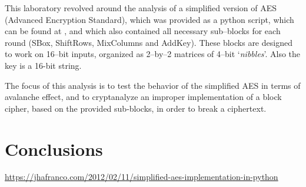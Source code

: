 \documentclass[12pt]{article}
\begin{document}
This laboratory revolved around the analysis of a simplified version of AES (Advanced Encryption Standard), which was provided as a python script, which can be found at \cite{Original Python implementation}, and which also contained all necessary sub–blocks for each round (SBox, ShiftRows, MixColumns and AddKey).
These blocks are designed to work on 16–bit inputs, organized as 2–by–2 matrices of 4–bit `\textit{nibbles}'. Also the key is a 16-bit string.

The focus of this analysis is to test the behavior of the simplified AES in terms of avalanche effect, and to cryptanalyze an improper implementation of a block cipher, based on the provided sub-blocks, in order to break a ciphertext.


\section{Conclusions}
\label{sec:04}

\begin{thebibliography}{5}
    \url{https://jhafranco.com/2012/02/11/simplified-aes-implementation-in-python}
\end{thebibliography}
\end{document}
